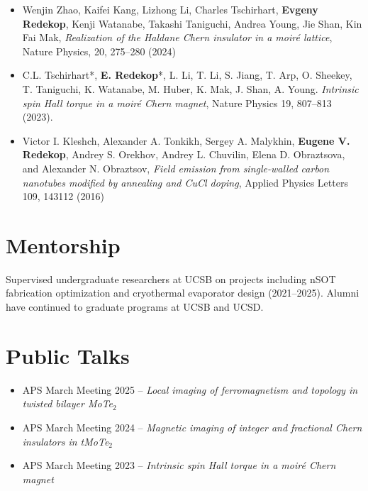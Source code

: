 \documentclass[11pt]{article}
\begin{document}
\begin{itemize}[leftmargin=*]
    \item Wenjin Zhao, Kaifei Kang, Lizhong Li, Charles Tschirhart, \textbf{Evgeny Redekop}, Kenji Watanabe, Takashi Taniguchi, Andrea Young, Jie Shan, Kin Fai Mak, \textit{Realization of the Haldane Chern insulator in a moiré lattice}, Nature Physics, 20, 275–280 (2024)
    \item C.L. Tschirhart*, \textbf{E. Redekop}*, L. Li, T. Li, S. Jiang, T. Arp, O. Sheekey, T. Taniguchi, K. Watanabe, M. Huber, K. Mak, J. Shan, A. Young. \textit{Intrinsic spin Hall torque in a moir\'e Chern magnet}, Nature Physics 19, 807–813 (2023).
    \item Victor I. Kleshch, Alexander A. Tonkikh, Sergey A. Malykhin, \textbf{Eugene V. Redekop}, Andrey S. Orekhov, Andrey L. Chuvilin, Elena D. Obraztsova, and Alexander N. Obraztsov, \textit{Field emission from single-walled carbon nanotubes modified by annealing and CuCl doping}, Applied Physics Letters 109, 143112 (2016)
\end{itemize}

\section*{Mentorship}
Supervised undergraduate researchers at UCSB on projects including nSOT fabrication optimization and cryothermal evaporator design (2021–2025). Alumni have continued to graduate programs at UCSB and UCSD.

\section*{Public Talks}
\begin{itemize}[leftmargin=*]
    \item APS March Meeting 2025 -- \textit{Local imaging of ferromagnetism and topology in twisted bilayer MoTe$_2$}
    \item APS March Meeting 2024 -- \textit{Magnetic imaging of integer and fractional Chern insulators in tMoTe$_2$}
    \item APS March Meeting 2023 -- \textit{Intrinsic spin Hall torque in a moir\'e Chern magnet}
\end{itemize}
\end{document}
